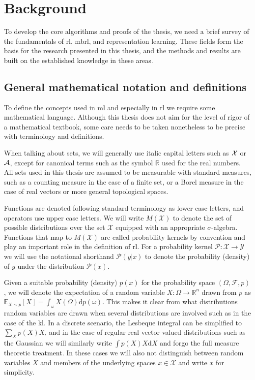 \chapter{Background}

To develop the core algorithms and proofs of the thesis, we need a brief survey of the fundamentals of \ac{rl}, \ac{mbrl}, and representation learning.
These fields form the basis for the research presented in this thesis, and the methods and results are built on the established knowledge in these areas.


\section{General mathematical notation and definitions}
To define the concepts used in \ac{ml} and especially in \ac{rl} we require some mathematical language.
Although this thesis does not aim for the level of rigor of a mathematical textbook, some care needs to be taken nonetheless to be precise with terminology and definitions.

When talking about sets, we will generally use italic capital letters such as $\mathcal{X}$ or $\mathcal{A}$, except for canonical terms such as the symbol $\mathbb{R}$ used for the real numbers.
All sets used in this thesis are assumed to be measurable with standard measures, such as a counting measure in the case of a finite set, or a Borel measure in the case of real vectors or more general topological spaces.

Functions are denoted following standard terminology as lower case letters, and operators use upper case letters.
We will write $M(\mathcal{X})$ to denote the set of possible distributions over the set $\mathcal{X}$ equipped with an appropriate $\sigma$-algebra.
Functions that map to $M(\mathcal{X})$ are called probability kernels by convention and play an important role in the definition of \ac{rl}.
For a probability kernel $\mathcal{P}: \mathcal{X} \rightarrow \mathcal{Y}$ we will use the notational shorthand $\mathcal{P}(y|x)$ to denote the probability (density) of $y$ under the distribution $\mathcal{P}(x)$.

Given a suitable probability (density) $p(x)$ for the probability space $(\Omega,\mathcal{F},p)$, we will denote the expectation of a random variable $X: \Omega \rightarrow \mathbb{R}^n$ drawn from $p$ as $\mathbb{E}_{X \sim p}\left[X\right] = \int_{\omega} X(\Omega) \mathrm{d} p(\omega)$.
This makes it clear from what distributions random variables are drawn when several distributions are involved such as in the case of the \ac{kl}.
In a discrete scenario, the Lesbeque integral can be simplified to $\sum_X p(X) X$, and in the case of regular real vector valued distributions such as the Gaussian we will similarly write $\int p(X) X \mathrm{d} X$ and forgo the full measure theoretic treatment.
In these cases we will also not distinguish between random variables $X$ and members of the underlying spaces $x \in \mathcal{X}$ and write $x$ for simplicity.


